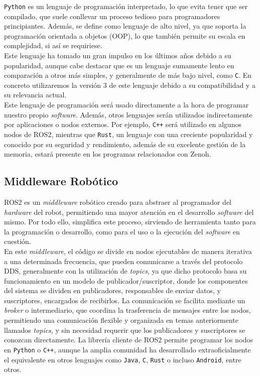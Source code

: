 \texttt{Python} es un lenguaje de programación interpretado, lo que evita tener
que ser compilado, que suele conllevar un proceso tedioso para programadores
principiantes.
Además, se define como lenguaje de alto nivel, ya que soporta la programación
orientada a objetos (OOP), lo que también permite su escala en complejidad, si
así se requiriese.
\\

Este lenguaje ha tomado un gran impulso en los últimos años debido a su
popularidad, aunque cabe destacar que es un lenguaje sumamente lento en
comparación a otros más simples, y generalmente de más bajo nivel, como
\texttt{C}.
En concreto utilizaremos la versión 3 de este lenguaje debido a su
compatibilidad y a su relevancia actual.
\\

Este lenguaje de programación será usado directamente a la hora de programar
nuestro propio \textit{software}.
Además, otros lenguajes serán utilizados indirectamente por aplicaciones o nodos
externos.
Por ejemplo, \texttt{C++} será utilizado en algunos nodos de ROS2, mientras que
\texttt{Rust}, un lenguaje con una creciente popularidad y conocido por su
seguridad y rendimiento, además de su excelente gestión de la memoria, estará
presente en los programas relacionados con Zenoh.
\\

\subsection{Middleware Robótico}
\label{sec:middleware_robotico}

ROS2 es un \textit{middleware} robótico creado para abstraer al programador del
\textit{hardware} del robot, permitiendo una mayor atención en el desarrollo
\textit{software} del mismo.
Por todo ello, simplifica este proceso, sirviendo de herramienta tanto para la
programación o desarrollo, como para el uso o la ejecución del \textit{software}
en cuestión.
\\

En este \textit{middleware}, el código se divide en nodos ejecutables de manera
iterativa a una determinada frecuencia, que pueden comunicarse a través del
protocolo DDS, generalmente con la utilización de \textit{topics}, ya que dicho
protocolo basa su funcionamiento en un modelo de publicador/suscriptor, donde
los componentes del sistema se dividen en publicadores, responsables de enviar
datos, y suscriptores, encargados de recibirlos.
La comunicación se facilita mediante un \textit{broker} o intermediario, que
coordina la trasferencia de mensajes entre los nodos, permitiendo una
comunicación flexible y organizada en temas anteriormente llamados
\textit{topics}, y sin necesidad requerir que los publicadores y suscriptores
se conozcan directamente.
La librería cliente de ROS2 permite programar los nodos en \texttt{Python} o
\texttt{C++}, aunque la amplia comunidad ha desarrollado extraoficialmente el
equivalente en otros lenguajes como \texttt{Java}, \texttt{C}, \texttt{Rust} o
incluso \texttt{Android}, entre otros.
\\


